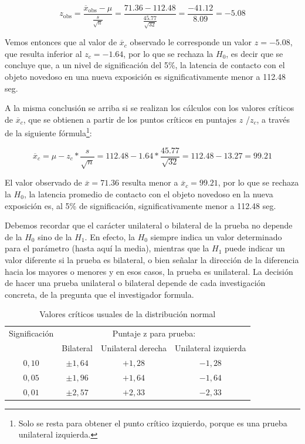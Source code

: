 \documentclass[]{book}
\let\rmarkdownfootnote\footnote%
\def\footnote{\protect\rmarkdownfootnote}
\begin{document}
\[z_{\text{obs}} = \frac{{\overline{x}}_{\text{obs}} - \mu}{\frac{s}{\sqrt{n}}} = \frac{71.36 - 112.48}{\frac{45.77}{\sqrt{32}}} = \frac{- 41.12}{8.09} = - 5.08\]

Vemos entonces que al valor de \({\overline{x}}_{c}\) observado le
corresponde un valor \(z=-5.08\), que resulta inferior al \(z_{c}=-1.64\), por lo que se rechaza la \(H_{0}\), es decir que se concluye que, a un nivel de significación del 5\%, la latencia de contacto con el objeto novedoso en una nueva exposición es significativamente menor a 112.48 seg.

A la misma conclusión se arriba si se realizan los cálculos con los
valores críticos de \({\overline{x}}_{c}\), que se obtienen a partir de
los puntos críticos en puntajes \(z\) /\(z_{c}\), a través de la siguiente
fórmula\footnote{Solo se resta para obtener el punto crítico izquierdo, porque es una prueba unilateral izquierda.}:

\[{\overline{x}}_{c} = \mu - z_{c}*\frac{s}{\sqrt{n}} = 112.48 - 1.64*\frac{45.77}{\sqrt{32}} = 112.48 - 13.27 = 99.21\]

El valor observado de \(\overline{x} = 71.36\) resulta menor a
\({\overline{x}}_{c} = 99.21\), por lo que se rechaza la \(H_{0}\), la latencia promedio de contacto con el objeto novedoso en la nueva exposición es, al 5\% de significación, significativamente menor a 112.48 seg.

Debemos recordar que el carácter unilateral o bilateral de la prueba no
depende de la \(H_{0}\) sino de la \(H_{1}\). En efecto, la \(H_{0}\) siempre indica un valor determinado para el parámetro (hasta aquí la media), mientras que la \(H_{1}\) puede indicar un valor diferente si la prueba es bilateral, o bien señalar la dirección de la diferencia hacia los mayores o menores y en esos casos, la prueba es unilateral. La decisión de hacer una prueba unilateral o bilateral depende de cada investigación concreta, de la pregunta que el investigador formula.

\begin{table}

\caption{\label{tab:unnamed-chunk-400}Valores críticos usuales de la distribución normal}
\centering
\begin{tabular}[t]{cccc}
\toprule
\multicolumn{1}{c}{Significación} & \multicolumn{3}{c}{Puntaje z para prueba:} \\
\cmidrule(l{3pt}r{3pt}){1-1} \cmidrule(l{3pt}r{3pt}){2-4}
 & Bilateral & Unilateral derecha & Unilateral izquierda\\
\midrule
\rowcolor{gray!6}  $0,10$ & $\pm 1,64$ & $+1,28$ & $-1,28$\\
$0,05$ & $\pm 1,96$ & $+1,64$ & $-1,64$\\
\rowcolor{gray!6}  $0,01$ & $\pm 2,57$ & $+2,33$ & $-2,33$\\
\bottomrule
\end{tabular}
\end{table}
\end{document}
